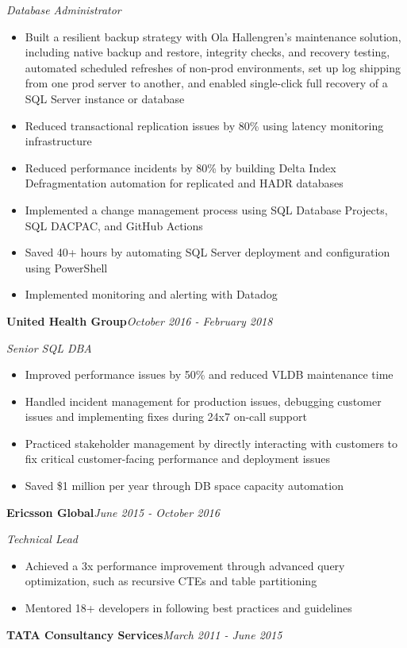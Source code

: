\documentclass[10pt,a4paper]{article}
\begin{document}
\textit{Database Administrator}\\[-5pt]
\begin{itemize}
  \item Built a resilient backup strategy with Ola Hallengren's maintenance solution, including native backup and restore, integrity checks, and recovery testing, automated scheduled refreshes of non-prod environments, set up log shipping from one prod server to another, and enabled single-click full recovery of a SQL Server instance or database
  \item Reduced transactional replication issues by 80\% using latency monitoring infrastructure
  \item Reduced performance incidents by 80\% by building Delta Index Defragmentation automation for replicated and HADR databases
  \item Implemented a change management process using SQL Database Projects, SQL DACPAC, and GitHub Actions
  \item Saved 40+ hours by automating SQL Server deployment and configuration using PowerShell
  \item Implemented monitoring and alerting with Datadog
\end{itemize}
\vspace{14.7pt}
\noindent\textbf{United Health Group}\hfill \textit{October 2016 - February 2018}

\textit{Senior SQL DBA}\\[-5pt]
\begin{itemize}
  \item Improved performance issues by 50\% and reduced VLDB maintenance time
  \item Handled incident management for production issues, debugging customer issues and implementing fixes during 24x7 on-call support
  \item Practiced stakeholder management by directly interacting with customers to fix critical customer-facing performance and deployment issues
  \item Saved \$1 million per year through DB space capacity automation
\end{itemize}
\vspace{14.7pt}
\noindent\textbf{Ericsson Global}\hfill \textit{June 2015 - October 2016}

\textit{Technical Lead}\\[-5pt]
\begin{itemize}
  \item Achieved a 3x performance improvement through advanced query optimization, such as recursive CTEs and table partitioning
  \item Mentored 18+ developers in following best practices and guidelines
\end{itemize}
\vspace{14.7pt}
\noindent\textbf{TATA Consultancy Services}\hfill \textit{March 2011 - June 2015}
\end{document}
